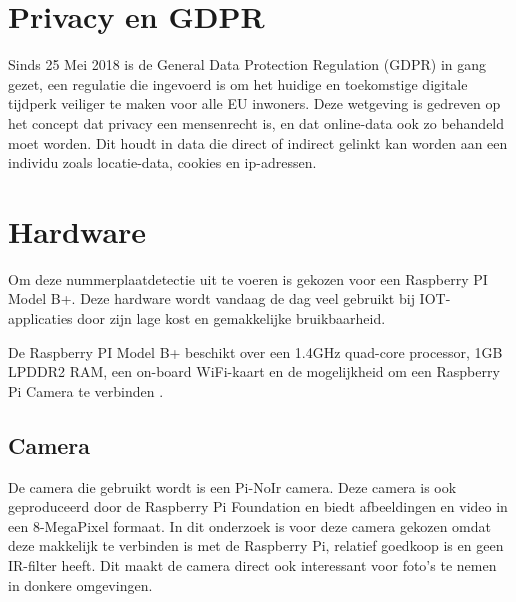 \section{Privacy en GDPR}
\label{sec:privacy-en-gdpr}

Sinds 25 Mei 2018 is de General Data Protection Regulation (GDPR) in gang gezet, een regulatie die ingevoerd is om het huidige  en toekomstige digitale tijdperk veiliger te maken voor alle EU inwoners.
Deze wetgeving is gedreven op het concept dat privacy een mensenrecht is, en dat online-data ook zo behandeld moet worden. Dit houdt in data die direct of indirect gelinkt kan worden aan een individu zoals locatie-data, cookies en ip-adressen.\autocite{goddard2017eu}

\section{Hardware}
Om deze nummerplaatdetectie uit te voeren is gekozen voor een Raspberry PI Model B+. Deze hardware wordt vandaag de dag veel gebruikt bij IOT-applicaties door zijn lage kost en gemakkelijke bruikbaarheid.  

De Raspberry PI Model B+ beschikt over een 1.4GHz quad-core processor, 1GB LPDDR2 RAM, een on-board WiFi-kaart en de mogelijkheid om een Raspberry Pi Camera te verbinden \autocite{raspberrypisitemodelbplus} .

\subsection{Camera}
De camera die gebruikt wordt is een Pi-NoIr camera. Deze camera is ook geproduceerd door de Raspberry Pi Foundation en biedt afbeeldingen en video in een 8-MegaPixel formaat. In dit onderzoek is voor deze camera gekozen omdat deze makkelijk te verbinden is met de Raspberry Pi, relatief goedkoop is en geen IR-filter heeft. Dit maakt de camera direct ook interessant voor foto's te nemen in donkere omgevingen. \autocite{raspberrypisitemodelpinoir}